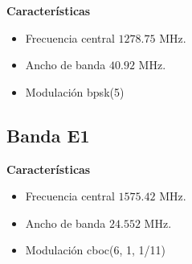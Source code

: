 \begin{justify}
    \textbf{Características}
    \begin{itemize}
        \item Frecuencia central $1278.75$ MHz.
        \item Ancho de banda $40.92$ MHz.
        \item Modulación \gls{bpsk}(5)
    \end{itemize}
\end{justify}

\subsection{Banda E1}

\begin{justify}
    \textbf{Características}
    \begin{itemize}
        \item Frecuencia central $1575.42$ MHz.
        \item Ancho de banda $24.552$ MHz.
        \item Modulación \gls{cboc}(6, 1, 1/11)
    \end{itemize}
\end{justify}